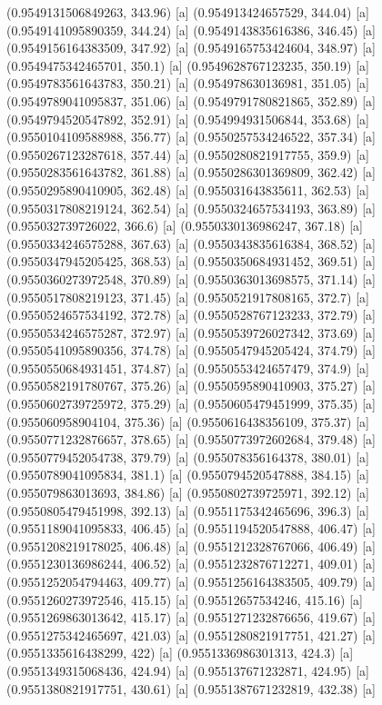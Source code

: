 {{{(0.9549131506849263, 343.96) [a] 
(0.954913424657529, 344.04) [a] 
(0.9549141095890359, 344.24) [a] 
(0.9549143835616386, 346.45) [a] 
(0.9549156164383509, 347.92) [a] 
(0.9549165753424604, 348.97) [a] 
(0.9549475342465701, 350.1) [a] 
(0.9549628767123235, 350.19) [a] 
(0.9549783561643783, 350.21) [a] 
(0.954978630136981, 351.05) [a] 
(0.9549789041095837, 351.06) [a] 
(0.9549791780821865, 352.89) [a] 
(0.9549794520547892, 352.91) [a] 
(0.954994931506844, 353.68) [a] 
(0.9550104109588988, 356.77) [a] 
(0.9550257534246522, 357.34) [a] 
(0.9550267123287618, 357.44) [a] 
(0.9550280821917755, 359.9) [a] 
(0.9550283561643782, 361.88) [a] 
(0.9550286301369809, 362.42) [a] 
(0.9550295890410905, 362.48) [a] 
(0.955031643835611, 362.53) [a] 
(0.9550317808219124, 362.54) [a] 
(0.9550324657534193, 363.89) [a] 
(0.955032739726022, 366.6) [a] 
(0.9550330136986247, 367.18) [a] 
(0.9550334246575288, 367.63) [a] 
(0.9550343835616384, 368.52) [a] 
(0.9550347945205425, 368.53) [a] 
(0.9550350684931452, 369.51) [a] 
(0.9550360273972548, 370.89) [a] 
(0.9550363013698575, 371.14) [a] 
(0.9550517808219123, 371.45) [a] 
(0.9550521917808165, 372.7) [a] 
(0.9550524657534192, 372.78) [a] 
(0.9550528767123233, 372.79) [a] 
(0.9550534246575287, 372.97) [a] 
(0.9550539726027342, 373.69) [a] 
(0.9550541095890356, 374.78) [a] 
(0.9550547945205424, 374.79) [a] 
(0.9550550684931451, 374.87) [a] 
(0.9550553424657479, 374.9) [a] 
(0.9550582191780767, 375.26) [a] 
(0.9550595890410903, 375.27) [a] 
(0.9550602739725972, 375.29) [a] 
(0.9550605479451999, 375.35) [a] 
(0.955060958904104, 375.36) [a] 
(0.9550616438356109, 375.37) [a] 
(0.9550771232876657, 378.65) [a] 
(0.9550773972602684, 379.48) [a] 
(0.9550779452054738, 379.79) [a] 
(0.955078356164378, 380.01) [a] 
(0.9550789041095834, 381.1) [a] 
(0.9550794520547888, 384.15) [a] 
(0.955079863013693, 384.86) [a] 
(0.9550802739725971, 392.12) [a] 
(0.9550805479451998, 392.13) [a] 
(0.9551175342465696, 396.3) [a] 
(0.9551189041095833, 406.45) [a] 
(0.9551194520547888, 406.47) [a] 
(0.9551208219178025, 406.48) [a] 
(0.9551212328767066, 406.49) [a] 
(0.9551230136986244, 406.52) [a] 
(0.9551232876712271, 409.01) [a] 
(0.9551252054794463, 409.77) [a] 
(0.9551256164383505, 409.79) [a] 
(0.9551260273972546, 415.15) [a] 
(0.95512657534246, 415.16) [a] 
(0.9551269863013642, 415.17) [a] 
(0.9551271232876656, 419.67) [a] 
(0.9551275342465697, 421.03) [a] 
(0.9551280821917751, 421.27) [a] 
(0.9551335616438299, 422) [a] 
(0.9551336986301313, 424.3) [a] 
(0.9551349315068436, 424.94) [a] 
(0.955137671232871, 424.95) [a] 
(0.9551380821917751, 430.61) [a] 
(0.9551387671232819, 432.38) [a] 
}}}
